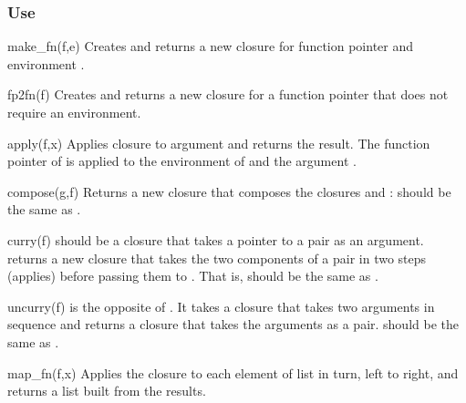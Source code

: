 \subsubsection*{Use}
\begin{defun}{make_fn}{(f,e)}
Creates and returns a new closure for function pointer  and environment
.
\end{defun}

\begin{defun}{fp2fn}{(f)}
Creates and returns a new closure for a function pointer that does not
require an environment.
\end{defun}

\begin{defun}{apply}{(f,x)}
Applies closure  to argument  and returns the result.  The
function pointer of  is applied to the environment of  and
the argument .
\end{defun}

\begin{defun}{compose}{(g,f)}
Returns a new closure that composes the closures  and :
 should be the same as
.
\end{defun}

\begin{defun}{curry}{(f)}
 should be a closure that takes a pointer to a pair as an
argument.   returns a new closure that takes the
two components of a pair in two steps (applies) before passing them to
.  That is,  should be
the same as .
\end{defun}

\begin{defun}{uncurry}{(f)}
 is the opposite of .  It takes a closure that
takes two arguments in sequence and returns a closure that takes the
arguments as a pair.  
should be the same as .
\end{defun}

\begin{defun}{map_fn}{(f,x)}
Applies the closure  to each element of list  in turn,
left to right, and returns a list built from the results.
\end{defun}

